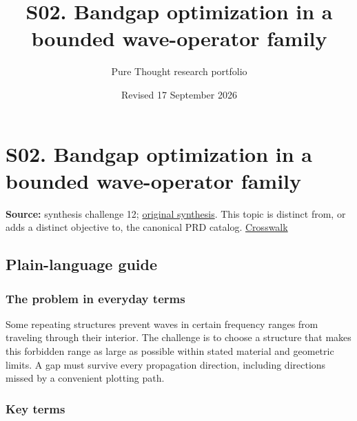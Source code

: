\documentclass[
  11pt,
]{article}
\title{S02. Bandgap optimization in a bounded wave-operator family}
\author{Pure Thought research portfolio}
\date{Revised 17 September 2026}
\begin{document}
\maketitle
\thispagestyle{empty}
\clearpage

\section{S02. Bandgap optimization in a bounded wave-operator family}

\textbf{Source:} synthesis challenge 12;
\href{https://github.com/rick-stevens-ai/Pure-Thought/blob/main/NOTES/30-Most-Compelling-Pure-Thought-AI-Challenges.md}{original
synthesis}. This topic is distinct from, or adds a distinct objective
to, the canonical PRD catalog.
\href{https://github.com/rick-stevens-ai/Pure-Thought/blob/main/reviews/SYNTHESIS-CROSSWALK.md}{Crosswalk}

\subsection{Plain-language guide}

\subsubsection{The problem in everyday terms}

Some repeating structures prevent waves in certain frequency ranges from
traveling through their interior. The challenge is to choose a structure
that makes this forbidden range as large as possible within stated
material and geometric limits. A gap must survive every propagation
direction, including directions missed by a convenient plotting path.

\subsubsection{Key terms}
\end{document}
